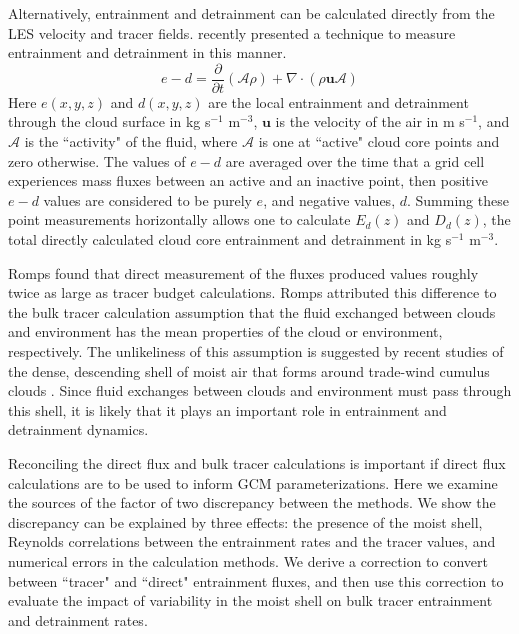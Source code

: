 \documentclass[draft,grl]{agutex}
\begin{document}
\begin{article}
Alternatively, entrainment and detrainment can be calculated directly from the 
LES velocity and tracer fields.  \cite{Romps2010} recently presented a 
technique to measure entrainment and detrainment in this manner.
\begin{equation}
  \label{eq:romps_e_minus_d}
  e - d = \frac{\partial}{\partial t}(\mathcal{A}\rho) 
        + \nabla \cdot (\rho \mathbf{u} \mathcal{A}) 
\end{equation}
Here $e(x,y,z)$ and $d(x,y,z)$ are the local entrainment and detrainment through 
the cloud surface in kg s$^{-1}$ m$^{-3}$, $\mathbf{u}$ is the velocity of the 
air in m s$^{-1}$, and $\mathcal{A}$ is the ``activity" of the fluid, where 
$\mathcal{A}$ is one at ``active" cloud core points and zero otherwise.  The 
values of $e - d$ are averaged over the time that a grid cell experiences mass 
fluxes between an active and an inactive point, then positive $e-d$ values 
are considered to be purely $e$, and negative values, $d$.  Summing these point 
measurements horizontally allows one to calculate  $E_d(z)$ and $D_d(z)$, the 
total directly calculated cloud core entrainment and detrainment in kg s$^{-1}$ 
m$^{-3}$.

Romps found that direct measurement of the fluxes produced values roughly twice 
as large as tracer budget calculations.  Romps attributed this difference to 
the bulk tracer calculation assumption that the fluid exchanged between clouds 
and environment has the mean properties of the cloud or environment, 
respectively.  The unlikeliness of this assumption is suggested by recent 
studies of the dense, descending shell of moist air that forms around 
trade-wind cumulus clouds \citep{Heus2008, Wang2010}.  Since fluid exchanges 
between clouds and environment must pass through this shell, it is likely that 
it plays an important role in entrainment and detrainment dynamics.

Reconciling the direct flux and bulk tracer calculations is important if direct 
flux calculations are to be used to inform GCM parameterizations.  Here we 
examine the sources of the factor of two discrepancy between the methods.  We 
show the discrepancy can be explained by three effects: the presence of the 
moist shell, Reynolds correlations between the entrainment rates and the tracer 
values, and numerical errors in the calculation methods.  We derive a 
correction to convert between ``tracer" and ``direct" entrainment fluxes, and 
then use this correction to evaluate the impact of variability in the moist 
shell on bulk tracer entrainment and detrainment rates.


\end{article}
\end{document}
